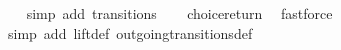 \begin{isabellebody}
\ \ \isamarkupfalse%
\ {\isacharparenleft}simp\ add{\isacharcolon}\ transitions{\isacharparenright}\isanewline
\ \ \isamarkupfalse%
\ choice{\isacharunderscore}return\ \isamarkupfalse%
\ fastforce\ \isanewline
\ \ \isamarkupfalse%
\ {\isacharparenleft}simp\ add{\isacharcolon}\ lift{\isacharunderscore}def\ outgoing{\isacharunderscore}transitions{\isacharunderscore}def{\isacharparenright}%
\endisatagproof
{\isafoldproof}%
%
\isadelimproof
\isanewline
%
\endisadelimproof
%
\isadelimtheory
\isanewline
%
\endisadelimtheory
%
\isatagtheory
{}\isamarkupfalse%
%
\endisatagtheory
{\isafoldtheory}%
%
\isadelimtheory
%
\endisadelimtheory
%
\end{isabellebody}%
\endinput

